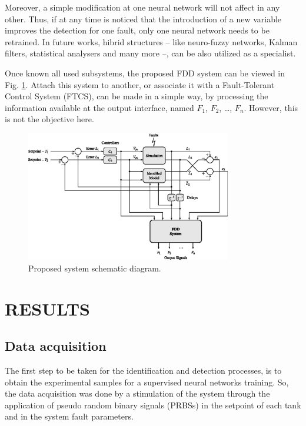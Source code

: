 \documentclass[10pt,fleqn,a4paper]{article}
\newcommand{\sequencia}[4]{$#1_{#2}$, $#1_{#3}$, \ldots, $#1_{#4}$}
\begin{document}
Moreover, a simple modification at one neural network will not affect in any
other. Thus, if at any time is noticed that the introduction of a new
variable improves the detection for one fault, only one neural network needs to
be retrained. In future works, hibrid structures -- like neuro-fuzzy networks,
Kalman filters, statistical analysers and many more --, can be also utilized as
a specialist.

Once known all used subsystems, the proposed FDD system can be viewed in Fig.
\ref{fig:comp}. Attach this system to another, or associate it with a
Fault-Tolerant Control System (FTCS), can be made in a simple way, by processing
the information available at the output interface, named
\sequencia{F}{1}{2}{n}. However, this is not the objective here.

\begin{figure}[htb]
\centering
    \includegraphics[width=0.8\textwidth]{imgs/comp}
    \caption{Proposed system schematic diagram.}
    \label{fig:comp}
\end{figure}

\section{RESULTS}\label{sec:results}

\subsection{Data acquisition}
The first step to be taken for the identification and detection processes, is to
obtain the experimental samples for a supervised neural networks training. So,
the data acquisition was done by a stimulation of the system through the
application of pseudo random binary signals (PRBSs) in the setpoint of each tank
and in the system fault parameters.
\end{document}

